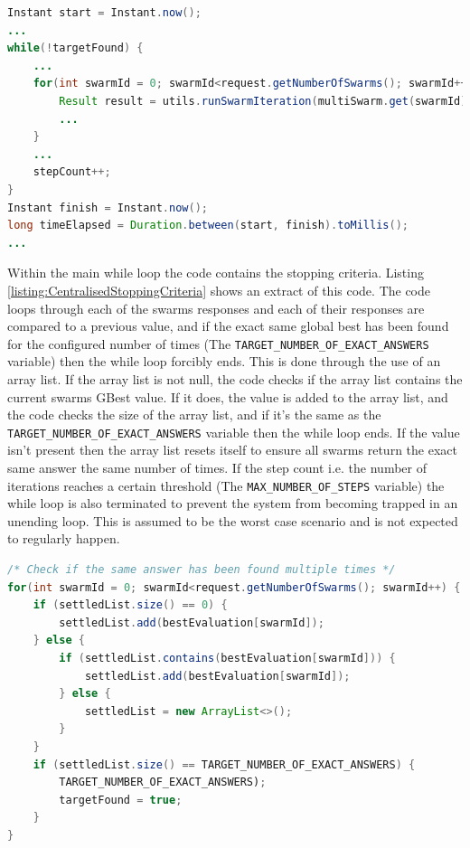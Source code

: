 \documentclass[oneside,12pt]{book}
\begin{document}
\begin{lstlisting}[basicstyle=\footnotesize, language=Java]
Instant start = Instant.now();
...
while(!targetFound) {
    ...
    for(int swarmId = 0; swarmId<request.getNumberOfSwarms(); swarmId++) {
        Result result = utils.runSwarmIteration(multiSwarm.get(swarmId), stepCount);
        ...
    }
    ...
    stepCount++;
}
Instant finish = Instant.now();
long timeElapsed = Duration.between(start, finish).toMillis();
...
\end{lstlisting}
\label{listing:CentralisedIterationMethod}

Within the main while loop the code contains the stopping criteria. Listing \ref{listing:CentralisedStoppingCriteria} shows an extract of this code. The code loops through each of the swarms responses and each of their responses are compared to a previous value, and if the exact same global best has been found for the configured number of times (The \verb|TARGET_NUMBER_OF_EXACT_ANSWERS| variable) then the while loop forcibly ends. This is done through the use of an array list. If the array list is not null, the code checks if the array list contains the current swarms GBest value. If it does, the value is added to the array list, and the code checks the size of the array list, and if it's the same as the \verb|TARGET_NUMBER_OF_EXACT_ANSWERS| variable then the while loop ends. If the value isn't present then the array list resets itself to ensure all swarms return the exact same answer the same number of times. If the step count i.e. the number of iterations reaches a certain threshold (The \verb|MAX_NUMBER_OF_STEPS| variable) the while loop is also terminated to prevent the system from becoming trapped in an unending loop. This is assumed to be the worst case scenario and is not expected to regularly happen. 

\begin{lstlisting}[basicstyle=\footnotesize, language=Java]
/* Check if the same answer has been found multiple times */
for(int swarmId = 0; swarmId<request.getNumberOfSwarms(); swarmId++) {
    if (settledList.size() == 0) {
        settledList.add(bestEvaluation[swarmId]);
    } else {
        if (settledList.contains(bestEvaluation[swarmId])) {
            settledList.add(bestEvaluation[swarmId]);
        } else {
            settledList = new ArrayList<>();
        }
    }
    if (settledList.size() == TARGET_NUMBER_OF_EXACT_ANSWERS) {
        TARGET_NUMBER_OF_EXACT_ANSWERS);
        targetFound = true;
    }
}
\end{lstlisting}
\label{listing:CentralisedStoppingCriteria}
\end{document}
